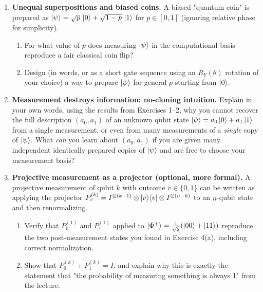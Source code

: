 \documentclass[11pt]{article}
\begin{document}
\begin{enumerate}[label=\textbf{Exercise \arabic*.}, leftmargin=2.2cm]
\item \textbf{Unequal superpositions and biased coins.}
A biased "quantum coin" is prepared as
$\ket\psi = \sqrt p\,\ket0 + \sqrt{1-p}\,\ket1$ for $p\in[0,1]$ (ignoring
relative phase for simplicity).
\begin{enumerate}[label=(\alph*)]
\item For what value of $p$ does measuring $\ket\psi$ in the
computational basis reproduce a fair classical coin flip?
\item Design (in words, or as a short gate sequence using an
$R_Y(\theta)$ rotation of your choice) a way to prepare $\ket\psi$ for
general $p$ starting from $\ket0$.
\end{enumerate}

\item \textbf{Measurement destroys information: no-cloning intuition.}
Explain in your own words, using the results from Exercises 1--2, why
you cannot recover the full description $(a_0,a_1)$ of an unknown qubit
state $\ket\psi=a_0\ket0+a_1\ket1$ from a single measurement, or even
from many measurements of a \emph{single} copy of $\ket\psi$. What
\emph{can} you learn about $(a_0,a_1)$ if you are given many independent
identically prepared copies of $\ket\psi$ and are free to choose your
measurement basis?

\item \textbf{Projective measurement as a projector (optional, more
formal).}
A projective measurement of qubit $k$ with outcome $v\in\{0,1\}$ can be
written as applying the projector $P_v^{(k)} = I^{\otimes(k-1)}\otimes
\ket v\!\bra v \otimes I^{\otimes(n-k)}$ to an $n$-qubit state and then
renormalizing.
\begin{enumerate}[label=(\alph*)]
\item Verify that $P_0^{(1)}$ and $P_1^{(1)}$ applied to
$\ket{\Phi^+}=\tfrac1{\sqrt2}(\ket{00}+\ket{11})$ reproduce the two
post-measurement states you found in Exercise 4(a), including correct
normalization.
\item Show that $P_0^{(k)}+P_1^{(k)} = I$, and explain why this is
exactly the statement that "the probability of measuring something is
always 1" from the lecture.
\end{enumerate}

\end{enumerate}
\end{document}
